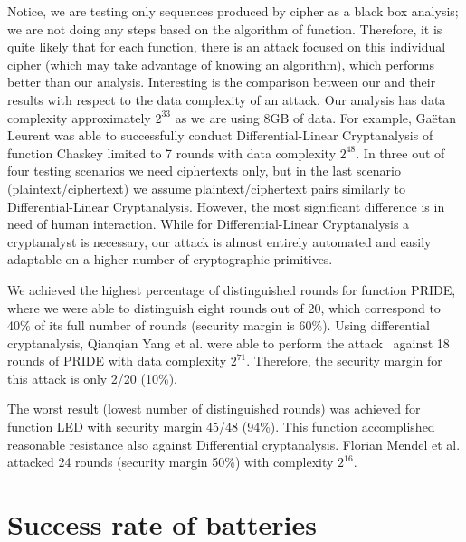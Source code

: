 \documentclass[
    digital,    %
    oneside,    %
    color,
    11pt,
    nocover,
    notable,
    nolof,
    nolot,
    final
]{fithesis3}
\renewcommand\_{\textunderscore\allowbreak}
\begin{document}
Notice, we are testing only sequences produced by cipher as a black box analysis; we are not doing any steps based on the algorithm of function. Therefore, it is quite likely that for each function, there is an attack focused on this individual cipher (which may take advantage of knowing an algorithm), which performs better than our analysis. Interesting is the comparison between our and their results with respect to the data complexity of an attack. Our analysis has data complexity approximately $2^{33}$ as we are using 8GB of data. For example, Gaëtan Leurent was able to successfully conduct Differential-Linear Cryptanalysis of function Chaskey limited to 7 rounds\cite{cryptoeprint:2015:968} with data complexity $2^{48}$. In three out of four testing scenarios we need ciphertexts only, but in the last scenario (plaintext/ciphertext) we assume plaintext/ciphertext pairs similarly to Differential-Linear Cryptanalysis. However, the most significant difference is in need of human interaction. While for Differential-Linear Cryptanalysis a cryptanalyst is necessary, our attack is almost entirely automated and easily adaptable on a higher number of cryptographic primitives.

We achieved the highest percentage of distinguished rounds for function PRIDE, where we were able to distinguish eight rounds out of 20, which correspond to 40\% of its full number of rounds (security margin is 60\%). Using differential cryptanalysis, Qianqian Yang et al. were able to perform the attack~\cite{pride-attack} against 18 rounds of PRIDE with data complexity $2^{71}$. Therefore, the security margin for this attack is only 2/20 (10\%).

The worst result (lowest number of distinguished rounds) was achieved for function LED with security margin 45/48 (94\%). This function accomplished reasonable resistance also against Differential cryptanalysis. Florian Mendel et al. attacked 24 rounds \cite{led-attack} (security margin 50\%) with complexity $2^{16}$.

\section{Success rate of batteries}
\label{sec:general results for batteries}
\end{document}
